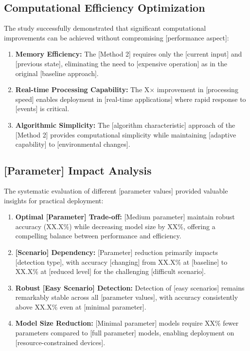 \subsection{Computational Efficiency Optimization}

The study successfully demonstrated that significant computational improvements can be achieved without compromising [performance aspect]:

\begin{enumerate}
\item \textbf{Memory Efficiency:} The [Method 2] requires only the [current input] and [previous state], eliminating the need to [expensive operation] as in the original [baseline approach].

\item \textbf{Real-time Processing Capability:} The X× improvement in [processing speed] enables deployment in [real-time applications] where rapid response to [events] is critical.

\item \textbf{Algorithmic Simplicity:} The [algorithm characteristic] approach of the [Method 2] provides computational simplicity while maintaining [adaptive capability] to [environmental changes].
\end{enumerate}

\subsection{[Parameter] Impact Analysis}

The systematic evaluation of different [parameter values] provided valuable insights for practical deployment:

\begin{enumerate}
\item \textbf{Optimal [Parameter] Trade-off:} [Medium parameter] maintain robust accuracy (XX.X\%) while decreasing model size by XX\%, offering a compelling balance between performance and efficiency.

\item \textbf{[Scenario] Dependency:} [Parameter] reduction primarily impacts [detection type], with accuracy [changing] from XX.X\% at [baseline] to XX.X\% at [reduced level] for the challenging [difficult scenario].

\item \textbf{Robust [Easy Scenario] Detection:} Detection of [easy scenarios] remains remarkably stable across all [parameter values], with accuracy consistently above XX.X\% even at [minimal parameter].

\item \textbf{Model Size Reduction:} [Minimal parameter] models require XX\% fewer parameters compared to [full parameter] models, enabling deployment on [resource-constrained devices].
\end{enumerate}

